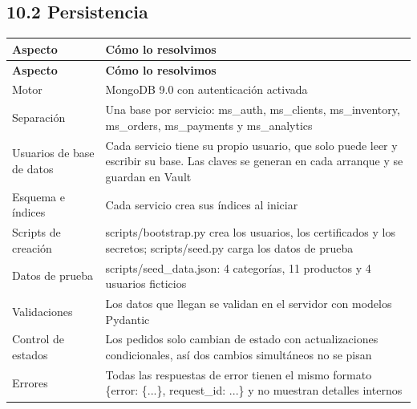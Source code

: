 \documentclass[10pt,letterpaper]{article}
\begin{document}
\subsection*{10.2 Persistencia}
{\footnotesize
\begin{longtable}{|P{\tabcolsep\relax}|P{\tabcolsep\relax}|}
\hline
\textbf{Aspecto} & \textbf{Cómo lo resolvimos} \\ \hline
\endfirsthead
\hline
\textbf{Aspecto} & \textbf{Cómo lo resolvimos} \\ \hline
\endhead
Motor & MongoDB 9.0 con autenticación activada \\ \hline
Separación & Una base por servicio: ms\_\allowbreak{}auth, ms\_\allowbreak{}clients, ms\_\allowbreak{}inventory, ms\_\allowbreak{}orders, ms\_\allowbreak{}payments y ms\_\allowbreak{}analytics \\ \hline
Usuarios de base de datos & Cada servicio tiene su propio usuario, que solo puede leer y escribir su base. Las claves se generan en cada arranque y se guardan en Vault \\ \hline
Esquema e índices & Cada servicio crea sus índices al iniciar \\ \hline
Scripts de creación & scripts/\allowbreak{}bootstrap.\allowbreak{}py crea los usuarios, los certificados y los secretos; scripts/\allowbreak{}seed.\allowbreak{}py carga los datos de prueba \\ \hline
Datos de prueba & scripts/\allowbreak{}seed\_\allowbreak{}data.\allowbreak{}json: 4 categorías, 11 productos y 4 usuarios ficticios \\ \hline
Validaciones & Los datos que llegan se validan en el servidor con modelos Pydantic  \\ \hline
Control de estados & Los pedidos solo cambian de estado con actualizaciones condicionales, así dos cambios simultáneos no se pisan \\ \hline
Errores & Todas las respuestas de error tienen el mismo formato \{\textquotedbl{}error\textquotedbl{}: \{...\}, \textquotedbl{}request\_\allowbreak{}id\textquotedbl{}: ...\} y no muestran detalles internos \\ \hline
\end{longtable}}
\end{document}
